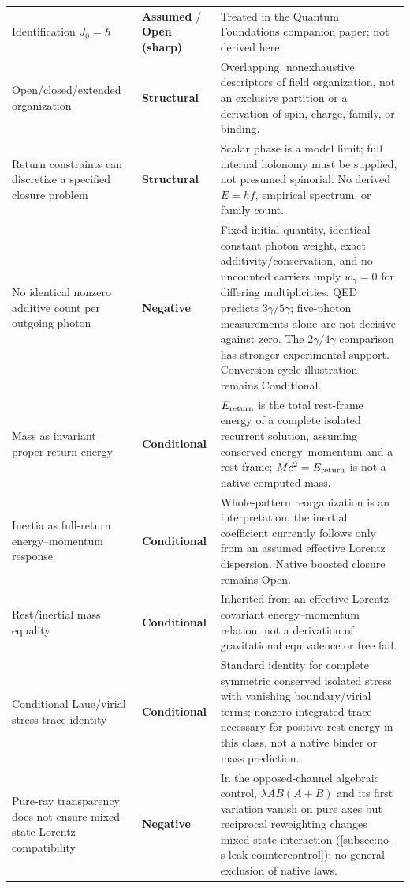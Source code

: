 \documentclass[11pt]{article}
\theoremstyle{definition}
\newcommand{\statusStructural}{\textcolor{blue!55!black}{\textbf{Structural}}}
\newcommand{\statusAssumed}{\textcolor{orange!80!black}{\textbf{Assumed}}}
\newcommand{\statusConditional}{\textcolor{yellow!60!black}{\textbf{Conditional}}}
\newcommand{\statusNegative}{\textcolor{red!65!black}{\textbf{Negative}}}
\newcommand{\statusSharpOpen}{\textcolor{red!35!black}{\textbf{Open (sharp)}}}
\begin{document}
\begin{longtable}{@{}P{4.9cm}P{3.0cm}P{6.8cm}@{}}
Identification $J_0=\hbar$ & \statusAssumed{} / \statusSharpOpen{} & Treated in the Quantum Foundations companion paper; not derived here. \\
Open/closed/extended organization & \statusStructural{} & Overlapping, nonexhaustive descriptors of field organization, not an exclusive partition or a derivation of spin, charge, family, or binding. \\
Return constraints can discretize a specified closure problem & \statusStructural{} & Scalar phase is a model limit; full internal holonomy must be supplied, not presumed spinorial. No derived $E=hf$, empirical spectrum, or family count. \\
No identical nonzero additive count per outgoing photon & \statusNegative{} & Fixed initial quantity, identical constant photon weight, exact additivity/conservation, and no uncounted carriers imply $w_\gamma=0$ for differing multiplicities. QED predicts $3\gamma/5\gamma$; five-photon measurements alone are not decisive against zero. The $2\gamma/4\gamma$ comparison has stronger experimental support. Conversion-cycle illustration remains Conditional. \\
Mass as invariant proper-return energy & \statusConditional{} & $E_{\rm return}$ is the total rest-frame energy of a complete isolated recurrent solution, assuming conserved energy--momentum and a rest frame; $Mc^2=E_{\rm return}$ is not a native computed mass. \\
Inertia as full-return energy--momentum response & \statusConditional{} & Whole-pattern reorganization is an interpretation; the inertial coefficient currently follows only from an assumed effective Lorentz dispersion. Native boosted closure remains Open. \\
Rest/inertial mass equality & \statusConditional{} & Inherited from an effective Lorentz-covariant energy--momentum relation, not a derivation of gravitational equivalence or free fall. \\
Conditional Laue/virial stress-trace identity & \statusConditional{} & Standard identity for complete symmetric conserved isolated stress with vanishing boundary/virial terms; nonzero integrated trace necessary for positive rest energy in this class, not a native binder or mass prediction. \\
Pure-ray transparency does not ensure mixed-state Lorentz compatibility & \statusNegative{} & In the opposed-channel algebraic control, $\lambda AB(A+B)$ and its first variation vanish on pure axes but reciprocal reweighting changes mixed-state interaction (\cref{subsec:no-s-leak-countercontrol}); no general exclusion of native laws. \\

\end{longtable}
\end{document}
